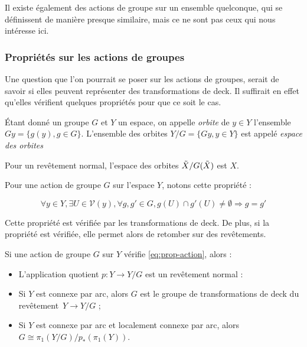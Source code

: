 Il existe également des actions de groupe sur un ensemble quelconque, qui se définissent de manière presque similaire, mais ce ne sont pas ceux qui nous intéresse ici.

\subsubsection{Propriétés sur les actions de groupes}

Une question que l'on pourrait se poser sur les actions de groupes, serait de savoir si elles peuvent représenter des transformations de deck. Il suffirait en effet qu'elles vérifient quelques propriétés pour que ce soit le cas.

\begin{definition}
Étant donné un groupe $G$ et $Y$ un espace, on appelle \emph{orbite} de $y\in Y$ l'ensemble~$Gy=\{g(y),g\in G\}$. L'ensemble des orbites ${Y/G=\{Gy,y\in Y\}}$ est appelé \emph{espace des orbites}
\end{definition}

\begin{exemple}
Pour un revêtement normal, l'espace des orbites $\Tilde{X}/G(\Tilde{X})$ est $X$.
\end{exemple}

Pour une action de groupe $G$ sur l'espace $Y$, notons cette propriété :

\begin{equation}\label{eq:prop-action}
\forall y\in Y,\exists U\in\mathcal{V}(y),\forall g,g'\in G, g(U)\cap g'(U)\neq\emptyset\Longrightarrow g=g'
\end{equation}

Cette propriété est vérifiée par les transformations de deck. De plus, si la propriété est vérifiée, elle permet alors de retomber sur des revêtements. 

\begin{proposition}
Si une action de groupe $G$ sur $Y$ vérifie \eqref{eq:prop-action}, alors :\begin{itemize}
    \item L'application quotient $p:Y\to Y/G$ est un revêtement normal :
    \item Si $Y$ est connexe par arc, alors $G$ est le groupe de transformations de deck du revêtement~${Y\to Y/G}$ ;
    \item Si $Y$ est connexe par arc et localement connexe par arc, alors $G\cong\pi_1(Y/G)/p_\ast(\pi_1(Y))$.
\end{itemize}
\end{proposition}

